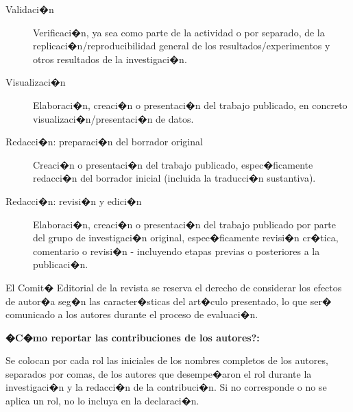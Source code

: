\documentclass[10pt,twoside]{rcmart} %
\begin{document}
\begin{description}
		\item[Validaci�n] Verificaci�n, ya sea como parte de la actividad o por separado, de la replicaci�n/reproducibilidad general de los resultados/experimentos y otros resultados de la investigaci�n.
		
		\item[Visualizaci�n] Elaboraci�n, creaci�n o presentaci�n del trabajo publicado, en concreto visualizaci�n/presentaci�n de datos.
		
		\item[Redacci�n: preparaci�n del borrador original] Creaci�n o presentaci�n del trabajo publicado, espec�ficamente redacci�n del borrador inicial (incluida la traducci�n sustantiva).
		
		\item[Redacci�n: revisi�n y edici�n] Elaboraci�n, creaci�n o presentaci�n del trabajo publicado por parte del grupo de investigaci�n original, espec�ficamente revisi�n cr�tica, comentario o revisi�n - incluyendo etapas previas o posteriores a la publicaci�n.
	\end{description}
		
	El Comit� Editorial de la revista se reserva el derecho de considerar los efectos de autor�a seg�n las caracter�sticas del art�culo presentado, lo que ser� comunicado a los autores durante el proceso de evaluaci�n.

	\textbf{�C�mo reportar las contribuciones de los autores?:}
	
	Se colocan por cada rol las iniciales de los nombres completos de los autores, separados por comas, de los autores que desempe�aron el rol durante la investigaci�n y la redacci�n de la contribuci�n. Si no corresponde o no se aplica un rol, no lo incluya en la declaraci�n. 
	
\end{document}
